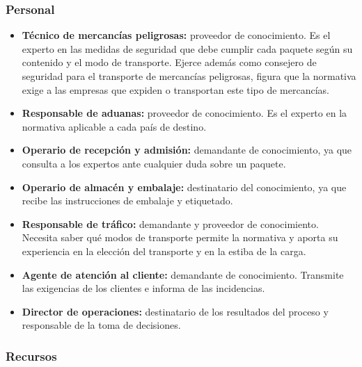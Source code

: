 \documentclass[12pt,a4paper,twoside,spanish]{article}      %
\begin{document}
\subsubsection{Personal}

\begin{itemize}
    \item \textbf{Técnico de mercancías peligrosas:} proveedor de conocimiento. Es el experto en las medidas de seguridad que debe cumplir cada paquete según su contenido y el modo de transporte. Ejerce además como consejero de seguridad para el transporte de mercancías peligrosas, figura que la normativa exige a las empresas que expiden o transportan este tipo de mercancías.
    \item \textbf{Responsable de aduanas:} proveedor de conocimiento. Es el experto en la normativa aplicable a cada país de destino.
    \item \textbf{Operario de recepción y admisión:} demandante de conocimiento, ya que consulta a los expertos ante cualquier duda sobre un paquete.
    \item \textbf{Operario de almacén y embalaje:} destinatario del conocimiento, ya que recibe las instrucciones de embalaje y etiquetado.
    \item \textbf{Responsable de tráfico:} demandante y proveedor de conocimiento. Necesita saber qué modos de transporte permite la normativa y aporta su experiencia en la elección del transporte y en la estiba de la carga.
    \item \textbf{Agente de atención al cliente:} demandante de conocimiento. Transmite las exigencias de los clientes e informa de las incidencias.
    \item \textbf{Director de operaciones:} destinatario de los resultados del proceso y responsable de la toma de decisiones.
\end{itemize}

\subsubsection{Recursos}
\end{document}

